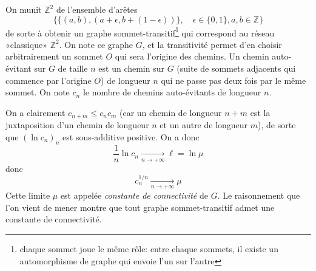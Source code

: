 \begin{ex}
    On munit $\mathbb Z^2$ de l'ensemble d'arêtes \[\{\{(a, b), (a+\epsilon, b+(1-\epsilon))\}, \quad \epsilon\in\{0,1\}, a,b\in\mathbb Z \}\] de sorte à obtenir un graphe sommet-transitif\footnote{chaque sommet joue le même rôle: entre chaque sommets, il existe un automorphisme de graphe qui envoie l'un sur l'autre} qui correspond au réseau «classique» $\mathbb Z^2$. On note ce graphe $G$, et la transitivité permet d'en choisir arbitrairement un sommet $O$ qui sera l'origine des chemins. Un chemin auto-évitant sur $G$ de taille $n$ est un chemin sur $G$ (suite de sommets adjacents qui commence par l'origine $O$) de longueur $n$ qui ne passe pas deux fois par le même sommet. On note $c_n$ le nombre de chemins auto-évitants de longueur $n$.

    On a clairement $c_{n+m}\leq c_nc_m$ (car un chemin de longueur $n+m$ est la juxtaposition d'un chemin de longueur $n$ et un autre de longueur $m$), de sorte que $(\ln c_n)_n$ est sous-additive positive. On a donc \[
        \frac1n\ln c_n\xrightarrow[n\to+\infty]{}\ell=\ln\mu
    \]
    donc \[
        c_n^{1/n}\xrightarrow[n\to+\infty]{}\mu
    \]
    Cette limite $\mu$ est appelée \emph{constante de connectivité} de $G$. Le raisonnement que l'on vient de mener montre que tout graphe sommet-transitif admet une constante de connectivité.
\end{ex}

